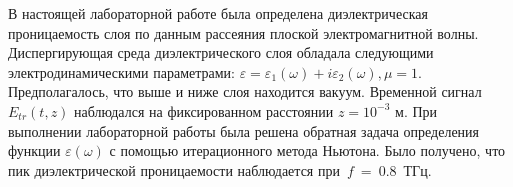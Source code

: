 В настоящей лабораторной работе была определена диэлектрическая проницаемость слоя по данным рассеяния плоской электромагнитной волны. Диспергирующая среда диэлектрического слоя обладала следующими электродинамическими параметрами: $\varepsilon = \varepsilon_1(\omega) + i \varepsilon_2(\omega), \mu = 1$. Предполагалось, что выше и ниже слоя находится вакуум. Временной сигнал $E_{tr}(t, z)$ наблюдался на фиксированном расстоянии $z = 10^{-3}$ м. При выполнении лабораторной работы была решена обратная задача определения функции $\varepsilon(\omega)$ с помощью итерационного метода Ньютона. Было получено, что пик диэлектрической проницаемости наблюдается при~$f~=~0.8$~ТГц.
